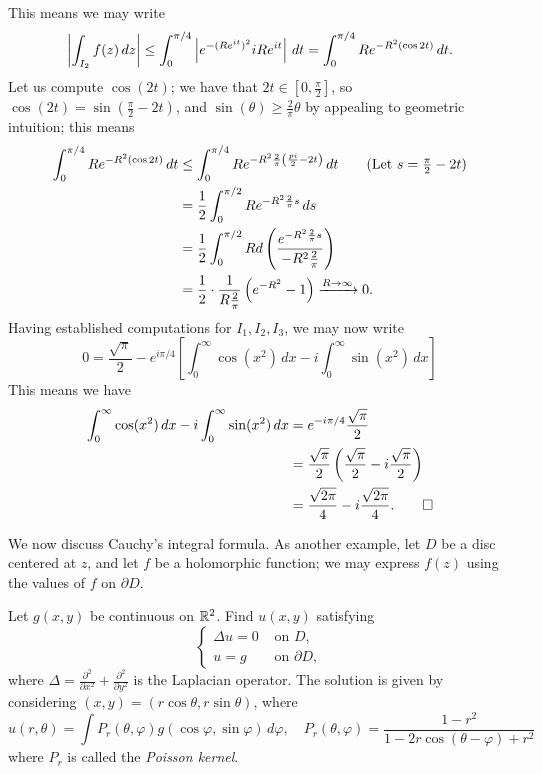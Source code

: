 \begin{solution}
    This means we may write
    \[ \left\lvert \int_{I_2} f(z) \, dz \right\rvert \leq \int_0^{\pi/4} \left\lvert e^{-(Re^{it})^2} i Re^{it} \right\rvert \, dt = \int_0^{\pi/4} Re^{-R^2(\cos 2t)} \, dt. \]
    Let us compute $\cos(2t)$; we have that $2t \in [0, \frac{\pi}{2}]$, so $\cos(2t) = \sin(\frac{\pi}{2} - 2t)$, and $\sin(\theta) \geq \frac{2}{\pi} \theta$ by appealing to geometric intuition; this means
    \begin{align*}
        \int_0^{\pi/4} Re^{-R^2(\cos 2t)} \, dt &\leq \int_0^{\pi/4} Re^{-R^2 \frac{2}{\pi} \left(\frac{pi}{2}  - 2t\right)} \, dt \tag{Let $s = \frac{\pi}{2} - 2t$}\\
        &= \frac{1}{2} \int_0^{\pi/2} Re^{-R^2 \frac{2}{\pi} s} \, ds \\
        &= \frac{1}{2} \int_0^{\pi/2} R d\left(\frac{e^{-R^2 \frac{2}{\pi} s}}{-R^2 \frac{2}{\pi}}\right) \\
        &= \frac{1}{2} \cdot \frac{1}{R \frac{2}{\pi}} \left(e^{-R^2} - 1\right) \taking{R \to \infty} 0.
    \end{align*}
    Having established computations for $I_1, I_2, I_3$, we may now write
    \[ 0 = \frac{\sqrt{\pi}}{2} - e^{i \pi/4} \left[\int_0^\infty \cos(x^2) \, dx - i \int_0^\infty \sin(x^2) \, dx \right] \]
    This means we have
    \begin{align*}
        \int_0^\infty \cos(x^2) \, dx - i \int_0^\infty \sin(x^2) \, dx &= e^{-i \pi/4} \frac{\sqrt{\pi}}{2} \\
        &= \frac{\sqrt{\pi}}{2} \left(\frac{\sqrt{\pi}}{2} - i \frac{\sqrt{\pi}}{2}\right) \\
        &= \frac{\sqrt{2\pi}}{4} - i \frac{\sqrt{2\pi}}{4}. \qedhere
    \end{align*}
\end{solution}
\noindent We now discuss Cauchy's integral formula. As another example, let $D$ be a disc centered at $z$, and let $f$ be a holomorphic function; we may express $f(z)$ using the values of $f$ on $\partial D$.
\begin{example}
    Let $g(x, y)$ be continuous on $\mathbb R^2$. Find $u(x, y)$ satisfying
    \[ \begin{cases} \Delta u = 0 & \text{ on } D, \\ u = g & \text{ on } \partial D, \end{cases} \]
    where $\Delta = \frac{\partial^2}{\partial x^2} + \frac{\partial^2}{\partial y^2}$ is the Laplacian operator. The solution is given by considering $(x, y) = (r \cos \theta, r \sin \theta)$, where
    \[ u(r, \theta) = \int P_r(\theta, \varphi) g(\cos \varphi, \sin \varphi) \, d\varphi, \quad P_r(\theta, \varphi) = \frac{1 - r^2}{1 - 2 r \cos(\theta - \varphi) + r^2} \]
    where $P_r$ is called the \textit{Poisson kernel}.
\end{example}
